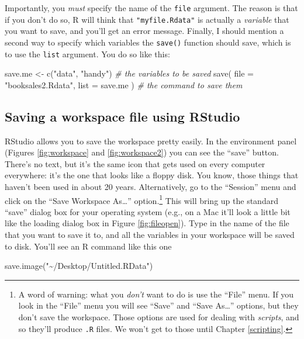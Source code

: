 \documentclass[
]{book}
\newenvironment{Shaded}{\begin{snugshade}}{\end{snugshade}}
\newcommand{\AttributeTok}[1]{\textcolor[rgb]{0.77,0.63,0.00}{#1}}
\newcommand{\CommentTok}[1]{\textcolor[rgb]{0.56,0.35,0.01}{\textit{#1}}}
\newcommand{\FunctionTok}[1]{\textcolor[rgb]{0.00,0.00,0.00}{#1}}
\newcommand{\NormalTok}[1]{#1}
\newcommand{\OtherTok}[1]{\textcolor[rgb]{0.56,0.35,0.01}{#1}}
\newcommand{\StringTok}[1]{\textcolor[rgb]{0.31,0.60,0.02}{#1}}
\begin{document}
Importantly, you \emph{must} specify the name of the \texttt{file} argument. The reason is that if you don't do so, R will think that \texttt{"myfile.Rdata"} is actually a \emph{variable} that you want to save, and you'll get an error message. Finally, I should mention a second way to specify which variables the \texttt{save()} function should save, which is to use the \texttt{list} argument. You do so like this:

\begin{Shaded}
\begin{Highlighting}[]
\NormalTok{save.me }\OtherTok{\textless{}{-}} \FunctionTok{c}\NormalTok{(}\StringTok{"data"}\NormalTok{, }\StringTok{"handy"}\NormalTok{)   }\CommentTok{\# the variables to be saved}
\FunctionTok{save}\NormalTok{( }\AttributeTok{file =} \StringTok{"booksales2.Rdata"}\NormalTok{, }\AttributeTok{list =}\NormalTok{ save.me )   }\CommentTok{\# the command to save them}
\end{Highlighting}
\end{Shaded}

\hypertarget{save1}{%
\subsection{Saving a workspace file using RStudio}\label{save1}}

RStudio allows you to save the workspace pretty easily. In the environment panel (Figures \ref{fig:workspace} and \ref{fig:workspace2}) you can see the ``save'' button. There's no text, but it's the same icon that gets used on every computer everywhere: it's the one that looks like a floppy disk. You know, those things that haven't been used in about 20 years. Alternatively, go to the ``Session'' menu and click on the ``Save Workspace As\ldots{}'' option.\footnote{A word of warning: what you \emph{don't} want to do is use the ``File'' menu. If you look in the ``File'' menu you will see ``Save'' and ``Save As\ldots{}'' options, but they don't save the workspace. Those options are used for dealing with \emph{scripts}, and so they'll produce \texttt{.R} files. We won't get to those until Chapter \ref{scripting}.} This will bring up the standard ``save'' dialog box for your operating system (e.g., on a Mac it'll look a little bit like the loading dialog box in Figure \ref{fig:fileopen}). Type in the name of the file that you want to save it to, and all the variables in your workspace will be saved to disk. You'll see an R command like this one

\begin{Shaded}
\begin{Highlighting}[]
\FunctionTok{save.image}\NormalTok{(}\StringTok{"\textasciitilde{}/Desktop/Untitled.RData"}\NormalTok{)}
\end{Highlighting}
\end{Shaded}
\end{document}
